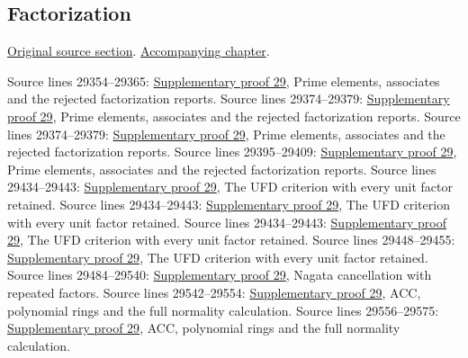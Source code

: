 \subsection{Factorization}
\hypertarget{algebra-source-section-factoring}{}
\noindent\href{https://github.com/stacks/stacks-project/blob/a04446e57ec1fbc252a871afcec7752fb2807b14/algebra.tex\#L29347}{Original source section}. \href{algebra.pdf\#nameddest=section-factoring}{Accompanying chapter}.

\begin{AlgebraSourceRoutes}
 Source lines 29354--29365: \hyperlink{algebra_factorization_notes_20260928}{Supplementary proof 29}, Prime elements, associates and the rejected factorization reports.
 Source lines 29374--29379: \hyperlink{algebra_factorization_notes_20260928}{Supplementary proof 29}, Prime elements, associates and the rejected factorization reports.
 Source lines 29374--29379: \hyperlink{algebra_factorization_notes_20260928}{Supplementary proof 29}, Prime elements, associates and the rejected factorization reports.
 Source lines 29395--29409: \hyperlink{algebra_factorization_notes_20260928}{Supplementary proof 29}, Prime elements, associates and the rejected factorization reports.
 Source lines 29434--29443: \hyperlink{algebra_factorization_notes_20260928}{Supplementary proof 29}, The UFD criterion with every unit factor retained.
 Source lines 29434--29443: \hyperlink{algebra_factorization_notes_20260928}{Supplementary proof 29}, The UFD criterion with every unit factor retained.
 Source lines 29434--29443: \hyperlink{algebra_factorization_notes_20260928}{Supplementary proof 29}, The UFD criterion with every unit factor retained.
 Source lines 29448--29455: \hyperlink{algebra_factorization_notes_20260928}{Supplementary proof 29}, The UFD criterion with every unit factor retained.
 Source lines 29484--29540: \hyperlink{algebra_factorization_notes_20260928}{Supplementary proof 29}, Nagata cancellation with repeated factors.
 Source lines 29542--29554: \hyperlink{algebra_factorization_notes_20260928}{Supplementary proof 29}, ACC, polynomial rings and the full normality calculation.
 Source lines 29556--29575: \hyperlink{algebra_factorization_notes_20260928}{Supplementary proof 29}, ACC, polynomial rings and the full normality calculation.

\end{AlgebraSourceRoutes}
